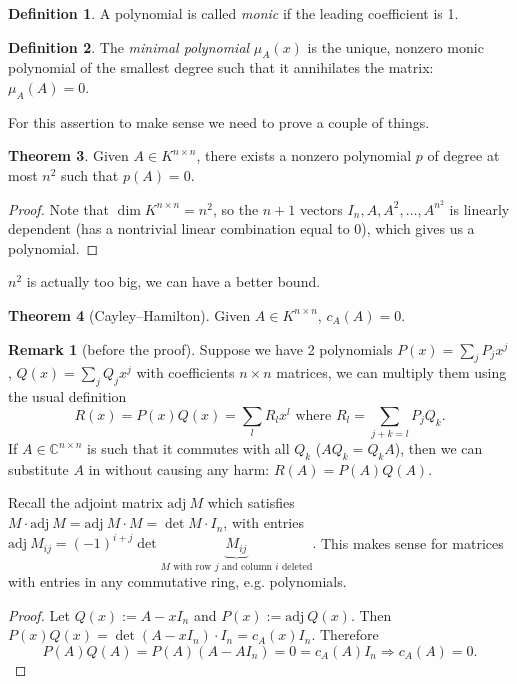 \documentclass[a4paper]{article}
\newcommand{\adj}{\text{adj}\ }
\theoremstyle{definition}
\newtheorem{defn}{Definition}[subsection]
\newtheorem{thm}[defn]{Theorem}
\newtheorem*{remark}{Remark}
\begin{document}
\begin{defn}
	A polynomial is called \textit{monic} if the leading coefficient is 1.
\end{defn}

\begin{defn}
The \textit{minimal polynomial} $\mu_{A}(x)$ is the unique, nonzero monic polynomial of the smallest degree such that it annihilates the matrix: $\mu_{A}(A)=0$.
\end{defn}

For this assertion to make sense we need to prove a couple of things.

\begin{thm}
	Given $A \in K^{n\times n}$, there exists a nonzero polynomial $p$ of degree at most $n^2$ such that $p(A)=0$.
\end{thm}

\begin{proof}
	Note that $\dim K^{n\times n}=n^2$, so the $n+1$ vectors $I_n, A, A^2, \ldots , A^{n^2}$ is linearly dependent (has a nontrivial linear combination equal to 0), which gives us a polynomial.
\end{proof}

$n^2$ is actually too big, we can have a better bound.

\begin{thm} [Cayley–Hamilton]
	Given $A \in K^{n\times n}$, $c_{A}(A)=0$.
\end{thm}

\begin{remark} [before the proof]
	Suppose we have 2 polynomials $P(x)=\sum_j P_j x^j$, $Q(x)=\sum_j Q_j x^j$ with coefficients $n \times n$ matrices, we can multiply them using the usual definition
\[
R(x) = P(x)Q(x)=\sum_l R_l x^l \text{ where } R_l=\sum_{j+k=l} P_j Q_k .
\]
If $A \in \mathbb C^{n\times n}$ is such that it commutes with all $Q_k$ ($A Q_k = Q_k A$), then we can substitute $A$ in without causing any harm: $R(A)=P(A)Q(A) .$

	Recall the adjoint matrix $\adj M$ which satisfies $M \cdot \adj M = \adj M \cdot M = \det M \cdot I_n$, with entries $\adj M_{ij}=(-1)^{i+j} \det \underbrace{M_{ij}}_{M\text{ with row }j\text{ and column }i\text{ deleted}} .$ This makes sense for matrices with entries in any commutative ring, e.g. polynomials.
\end{remark}

\begin{proof}
Let $Q(x):=A - x I_n$ and $P(x):= \adj Q(x)$. Then $P(x)Q(x)=\det (A-xI_n) \cdot I_n=c_{A}(x)I_n$. Therefore
\[
P(A)Q(A)=P(A)(A-A I_n)=0=c_{A}(A)I_n \Rightarrow c_{A}(A)=0 .
\]
\end{proof}
\end{document}
